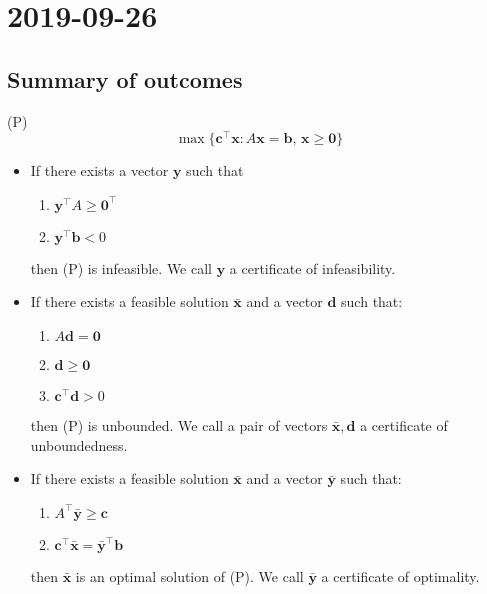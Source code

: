 \section{2019-09-26}
\begin{thmbox}
    \subsection{Summary of outcomes}
(P)
\[\max \{\bm{c}^\top \bm{x} : A\bm{x}=\bm{b},\,
\bm{x}\ge\bm{0}\}\]
\begin{itemize}
    \item If there exists a vector $ \bm{y} $ such that
    \begin{enumerate}[(1)]
        \item $\bm{y}^\top A\ge\bm{0}^\top $
        \item $\bm{y}^\top \bm{b}<0$
    \end{enumerate}
    then (P) is infeasible. We call $ \bm{y} $ a certificate of infeasibility.

    \item If there exists a feasible solution $\bar{\bm{x}}$ and a vector $ \bm{d} $ such that:
    \begin{enumerate}[(1)]
        \item $A\bm{d}=\bm{0}$
        \item $\bm{d}\ge \bm{0}$
        \item $\bm{c}^\top \bm{d}>0$
    \end{enumerate}
    then (P) is unbounded. We call a pair of vectors $ \bar{\bm{x}}, \bm{d} $
    a certificate of unboundedness.

    \item If there exists a feasible solution $ \bm{\bar{x}} $ and a vector $ \bm{\bar{y}} $ such that:
    \begin{enumerate}[(1)]
        \item $A^\top \bm{\bar{y}}\ge\bm{c}$
        \item $\bm{c}^\top \bm{\bar{x}}=\bm{\bar{y}}^\top \bm{b}$
    \end{enumerate}
    then $\bm{\bar{x}}$ is an optimal solution of (P). We call $ \bm{\bar{y}} $
    a certificate of optimality.
\end{itemize}
\end{thmbox}

